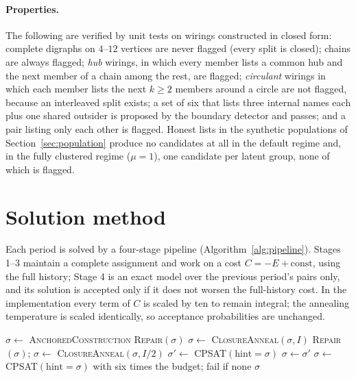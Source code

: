 \documentclass[11pt,a4paper]{article}
\theoremstyle{plain}
\theoremstyle{definition}
\theoremstyle{remark}
\begin{document}
\paragraph{Properties.} The following are verified by unit tests on wirings constructed in closed form: complete digraphs on $4$--$12$ vertices are never flagged (every split is closed); chains are always flagged; \emph{hub} wirings, in which every member lists a common hub and the next member of a chain among the rest, are flagged; \emph{circulant} wirings in which each member lists the next $k \ge 2$ members around a circle are not flagged, because an interleaved split exists; a set of six that lists three internal names each plus one shared outsider is proposed by the boundary detector and passes; and a pair listing only each other is flagged. Honest lists in the synthetic populations of Section~\ref{sec:population} produce no candidates at all in the default regime and, in the fully clustered regime ($\mu = 1$), one candidate per latent group, none of which is flagged.

\section{Solution method}
\label{sec:method}

Each period is solved by a four-stage pipeline (Algorithm~\ref{alg:pipeline}). Stages 1--3 maintain a complete assignment and work on a cost $C = -E + \text{const}$, using the full history; Stage 4 is an exact model over the previous period's pairs only, and its solution is accepted only if it does not worsen the full-history cost. In the implementation every term of $C$ is scaled by ten to remain integral; the annealing temperature is scaled identically, so acceptance probabilities are unchanged.

\begin{algorithm}[t]
\caption{One period}\label{alg:pipeline}
\begin{algorithmic}[1]
\State $\sigma \gets$ \textsc{AnchoredConstruction} 
\State \textsc{Repair}$(\sigma)$ 
\State $\sigma \gets$ \textsc{ClosureAnneal}$(\sigma, I)$ 
  \State \textsc{Repair}$(\sigma)$; $\sigma \gets$ \textsc{ClosureAnneal}$(\sigma, I/2)$
\EndFor
\State $\sigma' \gets$ \textsc{CPSAT}$(\text{hint} = \sigma)$ 
 $\sigma \gets \sigma'$ \EndIf
{} \State $\sigma \gets$ \textsc{CPSAT}$(\text{hint} = \sigma)$ with six times the budget; fail if none \EndIf
\State \Return $\sigma$
\end{algorithmic}
\end{algorithm}
\end{document}
